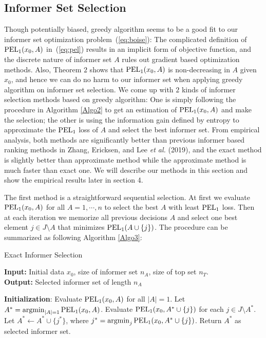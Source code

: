 \documentclass[12pt]{article}
\DeclareMathOperator*{\argmin}{argmin}
\begin{document}
\subsection{Informer Set Selection}
Though potentially biased, greedy algorithm seems to be a good fit to our informer set optimization problem~(\ref{eq:boise}): The complicated definition of ${\rm PEL}_1(x_0,A)$ in~(\ref{eq:pel}) results in an implicit form of objective function, and the discrete nature of informer set $A$ rules out gradient based optimization methods. Also, Theorem $2$ shows that ${\rm PEL}_1(x_0,A)$ is non-decreasing in $A$ given $x_0$, and hence we can do no harm to our informer set when applying greedy algorithm on informer set selection. We come up with $2$ kinds of informer selection methods based on greedy algorithm: One is simply following the procedure in Algorithm \ref{Algo2} to get an estimation of ${\rm PEL}_1(x_0,A)$ and make the selection; the other is using the information gain defined by entropy to approximate the ${\rm PEL}_1$ loss of $A$ and select the best informer set. From empirical analysis, both methods are significantly better than previous informer based ranking methods in Zhang, Ericksen, and Lee {\em et al.} (2019), and the exact method is slightly better than approximate method while the approximate method is much faster than exact one. We will describe our methods in this section and show the empirical results later in section 4.

The first method is a straightforward sequential selection. At first we evaluate ${\rm PEL}_1(x_0,A)$ for all $A=1,\cdots,n$ to select the best $A$ with least ${\rm PEL}_1$ loss. Then at each iteration we memorize all previous decisions $A$ and select one best element $j\in J\setminus A$ that minimizes ${\rm PEL}_1(A\cup \{j\})$. The procedure can be summarized as following Algorithm \ref{Algo3}:

\begin{algorithm}
\caption{Exact Informer Selection}\label{Algo3}
\hspace*{\algorithmicindent} \textbf{Input:} Initial data $x_0$, size of informer set $n_A$, size of top set $n_T$.\\
\hspace*{\algorithmicindent} \textbf{Output:} Selected informer set of length $n_A$
\begin{algorithmic}[1]
\State \textbf{Initialization}: Evaluate ${\rm PEL}_1(x_0,A)$ for all $|A|=1$. Let $A^* = \argmin_{|A|=1}{\rm PEL}_1(x_0,A) $.
    \State Evaluate ${\rm PEL}_1(x_0,A^*\cup\{j\})$ for each $j\in J\setminus A^*$.
    \State Let $A^* \gets A^*\cup\{j^*\}$, where $j^* = \argmin_{j}{\rm PEL}_1(x_0,A^*\cup\{j\})$.
\EndWhile
\State Return $A^*$ as selected informer set.
\end{algorithmic}
\end{algorithm}
\end{document}
